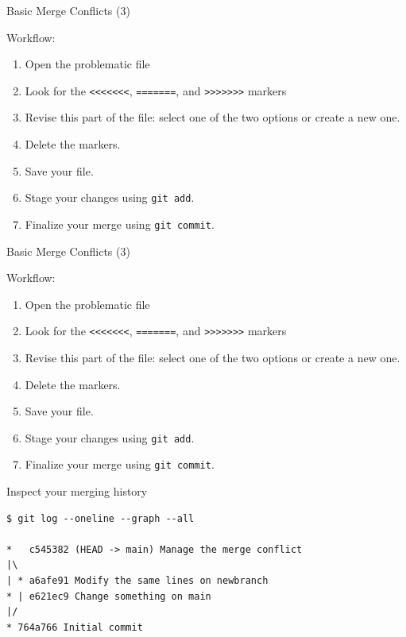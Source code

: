 \documentclass[handout]{beamer}
\begin{document}
\begin{frame}{Basic Merge Conflicts (3)}

Workflow:
\begin{enumerate}
	\item Open the problematic file
	\item Look for the \texttt{<<<<<<<}, \texttt{=======}, and \texttt{>>>>>>>} markers
	\item Revise this part of the file: select one of the two options or create a new one.
	\item Delete the markers. 
	\item Save your file.
	\item Stage your changes using \texttt{git add}.
	\item Finalize your merge using \texttt{git commit}.
\end{enumerate}

\end{frame}

\begin{frame}{Basic Merge Conflicts (3)}

Workflow:
\begin{enumerate}
	\item Open the problematic file
	\item Look for the \texttt{<<<<<<<}, \texttt{=======}, and \texttt{>>>>>>>} markers
	\item Revise this part of the file: select one of the two options or create a new one.
	\item Delete the markers. 
	\item Save your file.
	\item Stage your changes using \texttt{git add}.
	\item Finalize your merge using \texttt{git commit}.
\end{enumerate}

\end{frame}

\begin{frame}[fragile]{Inspect your merging history}

\begin{lstlisting}
$ git log --oneline --graph --all

*   c545382 (HEAD -> main) Manage the merge conflict
|\  
| * a6afe91 Modify the same lines on newbranch
* | e621ec9 Change something on main
|/  
* 764a766 Initial commit
\end{lstlisting}

\end{frame}
\end{document}
